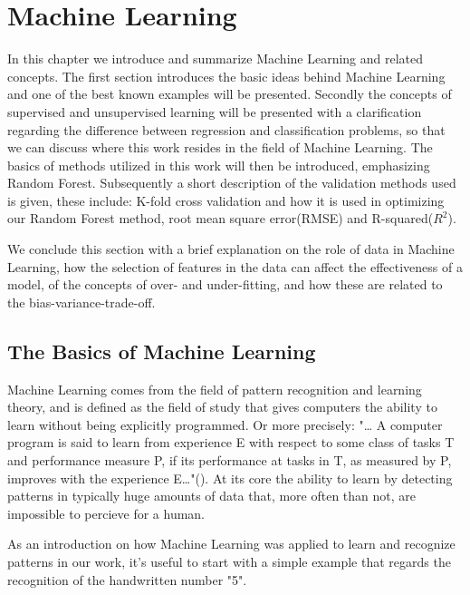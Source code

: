 	
	
\pagebreak
\section{Machine Learning}

In this chapter we introduce and summarize Machine Learning and related concepts. The first section introduces the basic ideas behind Machine Learning and one of the best known examples will be presented. Secondly the concepts of supervised and unsupervised learning will be presented with a clarification regarding the difference between regression and classification problems, so that we can discuss where this work resides in the field of Machine Learning. The basics of methods utilized in this work will then be introduced, emphasizing Random Forest. Subsequently a short description of the validation methods used is given, these include: K-fold cross validation and how it is used in optimizing our Random Forest method, root mean square error(RMSE) and R-squared($R^2$).
   
We conclude this section with a brief explanation on the role of data in Machine Learning, how the selection of features in the data can affect the effectiveness of a model, of the concepts of over- and under-fitting, and how these are related to the bias-variance-trade-off.




\subsection{The Basics of Machine Learning}

Machine Learning comes from the field of pattern recognition and learning theory, and is defined as the field of study that gives computers the ability to learn without being explicitly programmed. Or more precisely: "… A computer program is said to learn from experience E with respect to some class of tasks T and performance measure P, if its performance at tasks in T, as measured by P, improves with the experience E…"(\cite{mitchell1997machine}). At its core the ability to learn by detecting patterns in typically huge amounts of data that, more often than not, are impossible to percieve for a human.


	As an introduction on how Machine Learning was applied to learn and recognize patterns in our work, it's useful to start with a simple example that regards the recognition of the handwritten number "5". 
	

